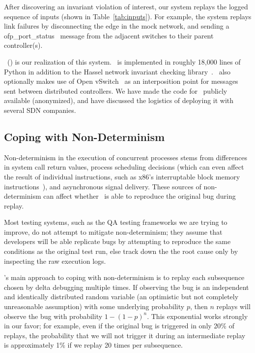 After discovering an invariant violation of interest, our system replays
the logged sequence of inputs (shown in Table~\ref{tab:inputs}). For example,
the system replays link failures
by disconnecting the edge in the mock network, and sending a
ofp\_port\_status~\cite{openflow} message from the adjacent switches to their parent controller(s).

\projectname~(\projectmeaning) is our realization of this system.
\projectname~is implemented in roughly 18,000 lines of Python in
addition to the Hassel network invariant checking library~\cite{hsa}.
\projectname~also optionally makes use of Open vSwitch~\cite{pfaff2009extending} as an interposition point for
messages sent between distributed controllers. We have
made the code
for \projectname~publicly available (anonymized), %
and have discussed the logistics of deploying it with several SDN companies.



\subsection{Coping with Non-Determinism}

Non-determinism in the execution of concurrent processes stems from
differences in system call return values, process scheduling decisions (which can
even affect the result of individual instructions, such as x86's
interruptable block memory instructions~\cite{Dunlap:2002:REI:844128.844148}),
and asynchronous signal
delivery. These sources of non-determinism can affect whether \projectname~is
able to reproduce the original bug during replay.

Most testing systems, such as the QA testing frameworks we are
trying to improve, do not attempt to mitigate non-determinism; they assume
that developers will be able replicate bugs by attempting to reproduce the
same conditions as the original test run, else track down the the root cause
only by
inspecting the raw execution logs.

\projectname's main approach to coping with non-determinism
is to replay each subsequence chosen
by delta debugging multiple times. If observing the bug
is an independent and identically distributed random variable (an optimistic
but not completely unreasonable assumption) with some
underlying probability $p$, then $n$
replays will observe the bug with probability $1-(1-p)^{n}$. This exponential
works strongly in our favor; for example, even if the original bug is
triggered in only 20\% of replays, the probability that we will not trigger
it during an intermediate replay is approximately
1\% if we replay 20 times per subsequence.

